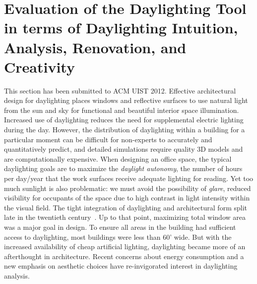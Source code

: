 \section{Evaluation of the Daylighting Tool in terms of Daylighting Intuition, Analysis, Renovation, and Creativity}

This section has been submitted to ACM UIST 2012.
Effective architectural design for daylighting places windows and
reflective surfaces to use natural light from the sun and sky for
functional and beautiful interior space illumination.  Increased use
of daylighting reduces the need for supplemental electric lighting
during the day.  However, the distribution of daylighting within a
building for a particular moment can be difficult for non-experts to
accurately and quantitatively predict, and detailed simulations
require quality 3D models and are computationally expensive.  When
designing an office space, the typical daylighting goals are to
maximize the {\em daylight autonomy}, the number of hours per day/year
that the work surfaces receive adequate lighting for reading.  Yet too
much sunlight is also problematic: we must avoid the possibility of
{\em glare}, reduced visibility for occupants of the space due to high
contrast in light intensity within the visual field.
%
The tight integration of daylighting and architectural form split late
in the twentieth century~\cite{lechner2001heating}.  Up to that point,
maximizing total window area was a major goal in design.  To ensure
all areas in the building had sufficient access to daylighting, most
buildings were less than 60' wide.  But with the increased
availability of cheap artificial lighting, daylighting became more of
an afterthought in architecture.  Recent concerns about energy
consumption and a new emphasis on aesthetic choices have
re-invigorated interest in daylighting analysis.

